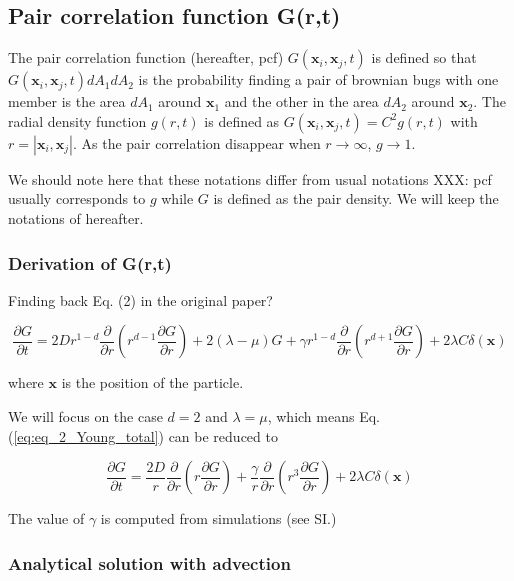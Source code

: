 \subsection*{Pair correlation function G(r,t)}

The pair correlation function (hereafter, pcf) $G(\mathbf{x}_i,\mathbf{x}_j,t)$ is defined so that $G(\mathbf{x}_i,\mathbf{x}_j,t)dA_1dA_2$ is the probability finding a pair of brownian bugs with one member is the area $dA_1$ around $\mathbf{x}_1$ and the other in the area $dA_2$ around $\mathbf{x}_2$. The radial density function $g(r,t)$ is defined as $G(\mathbf{x}_i,\mathbf{x}_j,t)=C^2g(r,t)$ with $r=|\mathbf{x}_i,\mathbf{x}_j|$. As the pair correlation disappear when $r\rightarrow\infty$, $g\rightarrow 1$.  

We should note here that these notations differ from usual notations XXX: pcf usually corresponds to $g$ while $G$ is defined as the pair density. We will keep the notations of \cite{young_reproductive_2001} hereafter. 

\subsubsection*{Derivation of G(r,t)}

Finding back Eq. (2) in the original paper?

\begin{equation}
\frac{\partial G}{\partial t}=2Dr^{1-d}\frac{\partial}{\partial r}\left(r^{d-1}\frac{\partial G}{\partial r}\right)+2(\lambda-\mu)G+\gamma r^{1-d}\frac{\partial}{\partial r}\left(r^{d+1}\frac{\partial G}{\partial r}\right)+2\lambda C\delta(\boldsymbol{x})\label{eq:eq_2_Young_total}
\end{equation}

where $\boldsymbol{x}$ is the position of the particle.

We will focus on the case $d=2$ and $\lambda=\mu$, which means Eq.
(\ref{eq:eq_2_Young_total}) can be reduced to

\begin{equation}
\frac{\partial G}{\partial t}=\frac{2D}{r}\frac{\partial}{\partial r}\left(r\frac{\partial G}{\partial r}\right)+\frac{\gamma}{r}\frac{\partial}{\partial r}\left(r^{3}\frac{\partial G}{\partial r}\right)+2\lambda C\delta(\boldsymbol{x})\label{eq:eq_2_Young_reduced}
\end{equation}

The value of $\gamma$ is computed from simulations (see SI.)

\subsubsection*{Analytical solution with advection}


